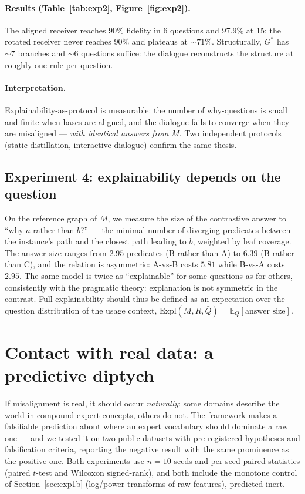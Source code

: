 \documentclass[10pt]{article}
\theoremstyle{definition}
\theoremstyle{plain}
\begin{document}
\paragraph{Results (Table~\ref{tab:exp2}, Figure~\ref{fig:exp2}).} The aligned receiver reaches $90\%$ fidelity in 6 questions and $97.9\%$ at 15; the rotated receiver never reaches $90\%$ and plateaus at ${\sim}71\%$. Structurally, $G^\ast$ has ${\sim}7$ branches and ${\sim}6$ questions suffice: the dialogue reconstructs the structure at roughly one rule per question.

\paragraph{Interpretation.} Explainability-as-protocol is measurable: the number of why-questions is small and finite when bases are aligned, and the dialogue fails to converge when they are misaligned --- \emph{with identical answers from $M$}. Two independent protocols (static distillation, interactive dialogue) confirm the same thesis.

\subsection{Experiment 4: explainability depends on the question}
\label{sec:exp4}

On the reference graph of $M$, we measure the size of the contrastive answer to ``why $a$ rather than $b$?'' --- the minimal number of diverging predicates between the instance's path and the closest path leading to $b$, weighted by leaf coverage. The answer size ranges from $2.95$ predicates (B rather than A) to $6.39$ (B rather than C), and the relation is asymmetric: A-vs-B costs $5.81$ while B-vs-A costs $2.95$. The same model is twice as ``explainable'' for some questions as for others, consistently with the pragmatic theory: explanation is not symmetric in the contrast. Full explainability should thus be defined as an expectation over the question distribution of the usage context, $\mathrm{Expl}(M, R, \bar{Q}) = \mathbb{E}_Q[\text{answer size}]$.

\section{Contact with real data: a predictive diptych}
\label{sec:real}

If misalignment is real, it should occur \emph{naturally}: some domains describe the world in compound expert concepts, others do not. The framework makes a falsifiable prediction about where an expert vocabulary should dominate a raw one --- and we tested it on two public datasets with pre-registered hypotheses and falsification criteria, reporting the negative result with the same prominence as the positive one. Both experiments use $n = 10$ seeds and per-seed paired statistics (paired $t$-test and Wilcoxon signed-rank), and both include the monotone control of Section~\ref{sec:exp1b} (log/power transforms of raw features), predicted inert.
\end{document}

